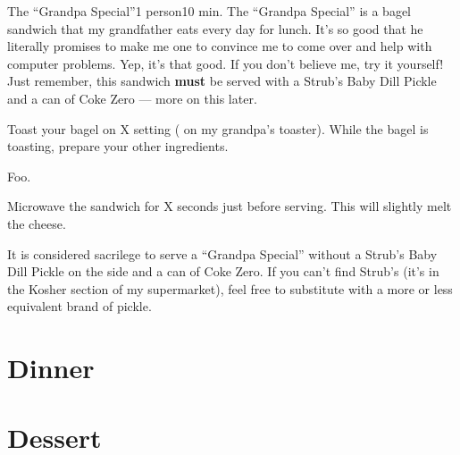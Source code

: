 \begin{recipe}{The \enquote{Grandpa Special}}{1 person}{10 min.}
\freeform The \enquote{Grandpa Special} is a bagel sandwich that my grandfather
eats every day for lunch. It's so good that he literally promises to make me one
to convince me to come over and help with computer problems. Yep, it's that
good.  If you don't believe me, try it yourself!  Just remember, this sandwich
\textbf{must} be served with a Strub's Baby Dill Pickle and a can of Coke Zero
---  more on this later.

Toast your bagel on X setting ( on my grandpa's toaster).
While the bagel is toasting, prepare your other ingredients.

Foo.

\newstep Microwave the sandwich for X seconds just before serving. This will slightly
melt the cheese.

It is considered sacrilege to serve a \enquote{Grandpa Special} without a Strub's
Baby Dill Pickle on the side and a can of Coke Zero. If you can't find Strub's
(it's in the Kosher section of my supermarket), feel free to substitute with
a more or less equivalent brand of pickle.
\end{recipe}

\section{Dinner}
\label{sec:findlay-dinner}

\clearpage

\section{Dessert}
\label{sec:findlay-dessert}

\clearpage
